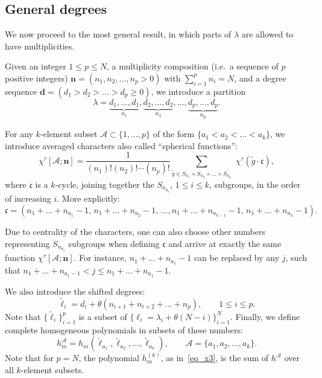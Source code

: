 \subsection{General degrees}

We now proceed to the most general result, in which parts of $\lambda$ are allowed to have multiplicities.

Given an integer $1\le p\le N$, a multiplicity composition (i.e.\ a sequence of $p$ positive integers) $\mathbf n=(n_1, n_2, \dots, n_p>0)$ with $\sum_{i=1}^p n_i=N$, and a degree sequence $\mathbf d=(d_1> d_2> \dots> d_p\ge 0)$, we introduce a partition
\begin{equation}
\label{eq_general_lambda}
\lambda= \underbrace{d_1,\dots, d_{1}}_{n_1}, \underbrace{d_2,\dots, d_{2}}_{n_2}, \dots, \underbrace{d_p,\dots, d_{p}}_{n_p}.
\end{equation}

For any $k$-element subset $\mathcal A\subset \{1,\dots,p\}$ of the form $\{a_1<a_2<\dots<a_k\}$, we introduce averaged characters also called ``spherical functions'':
\begin{equation}
\label{eq_family_character}
 \chi^\tau[\mathcal A; \mathbf n]=\frac{1}{(n_1)!(n_2)!\cdots (n_p)!}\sum_{\tilde g\in S_{n_1}\times S_{n_2}\times  \dots \times S_{n_p}}\,\, \chi^\tau(\tilde g \cdot \mathfrak c),
\end{equation}
where $\mathfrak c$ is a $k$-cycle, joining together the $S_{n_{a_i}}$, $1\le i\le k$, subgroups, in the order of increasing $i$. More explicitly:
$$
 \mathfrak c= (n_1+\dots+n_{a_1}-1,\, n_1+\dots+n_{a_2}-1,\, \dots, n_1+\dots+n_{a_{k-1}}-1,\, n_1+\dots+n_{a_{k}}-1).
$$
\begin{rema}
Due to centrality of the characters, one can also choose other numbers representing $S_{n_{a_i}}$ subgroups when defining $\mathfrak c$ and arrive at exactly the same function $\chi^{\tau}[\mathcal A; \mathbf n]$. For instance, $n_1+\dots+n_{a_1}-1$ can be replaced by any $j$, such that $n_1+\dots+ n_{a_1-1}<j \le  n_1+\dots+n_{a_1}-1$.
\end{rema}

We also introduce the shifted degrees:
$$
 \tilde \ell_i= d_i + \theta (n_{i+1}+n_{i+2}+\dots+n_p),\qquad 1\le i \le p.
$$
Note that $\{\tilde \ell_i\}_{i=1}^p$ is a subset of $\{\ell_i=\lambda_{i}+\theta(N-i)\}_{i=1}^N$. Finally, we define complete homogeneous polynomials in subsets of these numbers:
\begin{equation}
\label{eq_general_h}
 h^{\mathcal A}_{m}=h_m(\tilde \ell_{a_1},\tilde \ell_{a_2},\dots,\tilde \ell_{a_k}), \qquad \mathcal A=\{a_1,a_2,\dots,a_k\}.
\end{equation}
Note that for $p=N$, the polynomial $h^{(k)}_m$, as in~\eqref{eq_x3}, is the sum of $h^{\mathcal A}$ over all $k$-element subsets.

